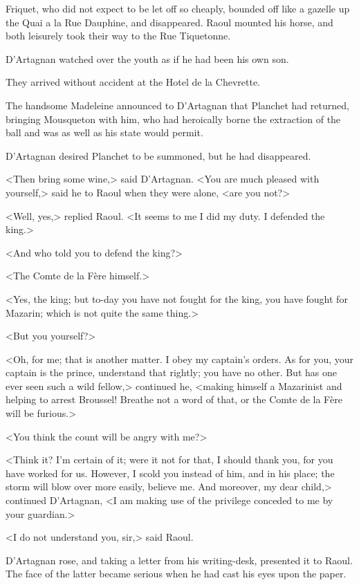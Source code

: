 Friquet, who did not expect to be let off so cheaply, bounded off like a gazelle up the Quai a la Rue Dauphine, and disappeared. Raoul mounted his horse, and both leisurely took their way to the Rue Tiquetonne.

D'Artagnan watched over the youth as if he had been his own son.

They arrived without accident at the Hotel de la Chevrette.

The handsome Madeleine announced to D'Artagnan that Planchet had returned, bringing Mousqueton with him, who had heroically borne the extraction of the ball and was as well as his state would permit.

D'Artagnan desired Planchet to be summoned, but he had disappeared.

<Then bring some wine,> said D'Artagnan. <You are much pleased with yourself,> said he to Raoul when they were alone, <are you not?>

<Well, yes,> replied Raoul. <It seems to me I did my duty. I defended the king.>

<And who told you to defend the king?>

<The Comte de la Fère himself.>

<Yes, the king; but to-day you have not fought for the king, you have fought for Mazarin; which is not quite the same thing.>

<But you yourself?>

<Oh, for me; that is another matter. I obey my captain's orders. As for you, your captain is the prince, understand that rightly; you have no other. But has one ever seen such a wild fellow,> continued he, <making himself a Mazarinist and helping to arrest Broussel! Breathe not a word of that, or the Comte de la Fère will be furious.>

<You think the count will be angry with me?>

<Think it? I'm certain of it; were it not for that, I should thank you, for you have worked for us. However, I scold you instead of him, and in his place; the storm will blow over more easily, believe me. And moreover, my dear child,> continued D'Artagnan, <I am making use of the privilege conceded to me by your guardian.>

<I do not understand you, sir,> said Raoul.

D'Artagnan rose, and taking a letter from his writing-desk, presented it to Raoul. The face of the latter became serious when he had cast his eyes upon the paper.

